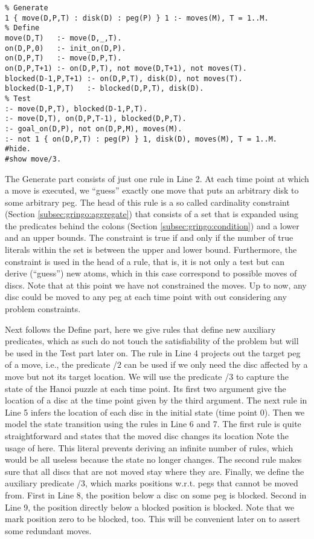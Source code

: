 \begin{lstlisting}
% Generate
1 { move(D,P,T) : disk(D) : peg(P) } 1 :- moves(M), T = 1..M.
% Define
move(D,T)   :- move(D,_,T).
on(D,P,0)   :- init_on(D,P).
on(D,P,T)   :- move(D,P,T).
on(D,P,T+1) :- on(D,P,T), not move(D,T+1), not moves(T).
blocked(D-1,P,T+1) :- on(D,P,T), disk(D), not moves(T).
blocked(D-1,P,T)   :- blocked(D,P,T), disk(D).
% Test
:- move(D,P,T), blocked(D-1,P,T).
:- move(D,T), on(D,P,T-1), blocked(D,P,T).
:- goal_on(D,P), not on(D,P,M), moves(M). 
:- not 1 { on(D,P,T) : peg(P) } 1, disk(D), moves(M), T = 1..M.
#hide.
#show move/3. 
\end{lstlisting}%
The Generate part consists of just one rule in Line 2.
At each time point  at which a move is executed, we
``guess'' exactly one move that puts an arbitrary disk to some arbitrary peg.
The head of this rule is a so called cardinality constraint (Section \ref{subsec:gringo:aggregate}) that
consists of a set that is expanded using the predicates behind the colons (Section \ref{subsec:gringo:condition}) and a lower and an upper bounds.
The constraint is true if and only if the number of true literals within the set is between the upper and lower bound.
Furthermore, the constraint is used in the head of a rule, 
that is, it is not only a test but can derive (``guess'') new atoms, which in this case correspond to possible moves of discs.
Note that at this point we have not constrained the moves.
Up to now, any disc could be moved to any peg at each time point with out considering any problem constraints.

Next follows the Define part, here we give rules that define new auxiliary predicates, 
which as such do not touch the satisfiability of the problem but will be used in the Test part later on.
The rule in Line 4 projects out the target peg of a move, i.e., the predicate /$2$ can be used 
if we only need the disc affected by a move but not its target location.
We will use the predicate /$3$ to capture the state of the Hanoi puzzle at each time point.
Its first two argument give the location of a disc at the time point given by the third argument.
The next rule in Line 5 infers the location of each disc in the initial state (time point 0).
Then we model the state transition using the rules in Line 6 and 7.
The first rule is quite straightforward and states that the moved disc changes its location
Note the usage of  here.
This literal prevents deriving an infinite number of rules, which would be all useless 
because the state no longer changes.
The second rule makes sure that all discs that are not moved stay where they are.
Finally, we define the auxiliary predicate /$3$, 
which marks positions w.r.t. pegs that cannot be moved from.
First in Line 8, the position below a disc on some peg is blocked.
Second in Line 9, the position directly below a blocked position is blocked.
Note that we mark position zero to be blocked, too.
This will be convenient later on to assert some redundant moves.

